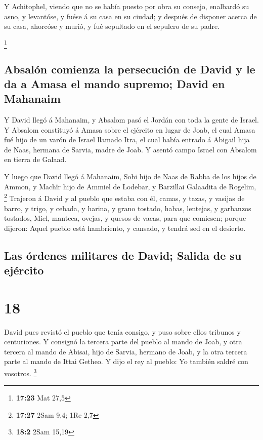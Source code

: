  Y Achitophel, viendo que no se había puesto por obra su
consejo, enalbardó su asno, y levantóse, y fuése á su casa en su ciudad;
y después de disponer acerca de su casa, ahorcóse y murió, y fué
sepultado en el sepulcro de su padre.

\footnote{\textbf{17:23} Mat 27,5}

\hypertarget{absaluxf3n-comienza-la-persecuciuxf3n-de-david-y-le-da-a-amasa-el-mando-supremo-david-en-mahanaim}{%
\subsection{Absalón comienza la persecución de David y le da a Amasa el
mando supremo; David en
Mahanaim}\label{absaluxf3n-comienza-la-persecuciuxf3n-de-david-y-le-da-a-amasa-el-mando-supremo-david-en-mahanaim}}

 Y David llegó á Mahanaim, y Absalom pasó el Jordán con
toda la gente de Israel.  Y Absalom constituyó á Amasa
sobre el ejército en lugar de Joab, el cual Amasa fué hijo de un varón
de Israel llamado Itra, el cual había entrado á Abigail hija de Naas,
hermana de Sarvia, madre de Joab.  Y asentó campo Israel
con Absalom en tierra de Galaad.

 Y luego que David llegó á Mahanaim, Sobi hijo de Naas de
Rabba de los hijos de Ammon, y Machîr hijo de Ammiel de Lodebar, y
Barzillai Galaadita de Rogelim, \footnote{\textbf{17:27} 2Sam 9,4; 1Re
  2,7}  Trajeron á David y al pueblo que estaba con él,
camas, y tazas, y vasijas de barro, y trigo, y cebada, y harina, y grano
tostado, habas, lentejas, y garbanzos tostados,  Miel,
manteca, ovejas, y quesos de vacas, para que comiesen; porque dijeron:
Aquel pueblo está hambriento, y cansado, y tendrá sed en el desierto.

\hypertarget{las-uxf3rdenes-militares-de-david-salida-de-su-ejuxe9rcito}{%
\subsection{Las órdenes militares de David; Salida de su
ejército}\label{las-uxf3rdenes-militares-de-david-salida-de-su-ejuxe9rcito}}

\hypertarget{section-17}{%
\section{18}\label{section-17}}

 David pues revistó el pueblo que tenía consigo, y puso
sobre ellos tribunos y centuriones.  Y consignó la tercera
parte del pueblo al mando de Joab, y otra tercera al mando de Abisai,
hijo de Sarvia, hermano de Joab, y la otra tercera parte al mando de
Ittai Getheo. Y dijo el rey al pueblo: Yo también saldré con vosotros.
\footnote{\textbf{18:2} 2Sam 15,19}

